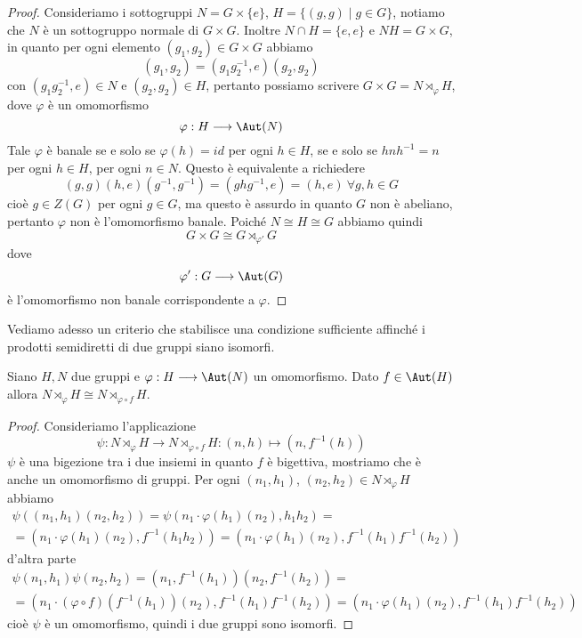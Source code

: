 \documentclass[11pt]{scrartcl}
\begin{document}
	\begin{proof}
		Consideriamo i sottogruppi $N = G\times\{e\}$, $H = \{(g, g) \mid g \in G\}$,
		notiamo che $N$ è un sottogruppo normale di $G\times G$. Inoltre 
		$N\cap H = \{e, e\}$ e $NH = G\times G$, in quanto per 
		ogni elemento $(g_1, g_2) \in G\times G$ abbiamo
		\[
		(g_1, g_2) = (g_1g_2^{-1}, e)(g_2, g_2)
		\]
		con $(g_1g_2^{-1}, e) \in N$ e $(g_2, g_2) \in H$, pertanto possiamo 
		scrivere $G \times G = N \rtimes_{\varphi} H$, dove $\varphi$ è un omomorfismo
		\[
		\varphi: H \longrightarrow \Aut(N)
		\]
		Tale $\varphi$ è banale se e solo se $\varphi(h) = id$ per ogni $h \in H$,
		se e solo se $hnh^{-1} = n$ per ogni $h \in H$, per ogni $n \in N$.
		Questo è equivalente a richiedere 
		\[
		(g, g)(h, e)(g^{-1}, g^{-1}) = (ghg^{-1}, e)= (h, e)~\forall g, h \in G
		\]
		cioè $g \in Z(G)$ per ogni $g \in G$,
		ma questo è assurdo in quanto $G$ non è abeliano, pertanto $\varphi$
		non è l'omomorfismo banale. Poiché $N \cong H \cong G$ abbiamo quindi
		\[
		G \times G \cong G\rtimes_{\varphi'}G
		\]
		dove
		\[
		\varphi':G \longrightarrow \Aut(G)
		\]
		è l'omomorfismo non banale corrispondente a $\varphi$.
	\end{proof}
	
	Vediamo adesso un criterio che stabilisce una condizione sufficiente affinché 
	i prodotti semidiretti di due gruppi siano isomorfi.
	
	\begin{proposition}
		\label{prop1.74}
		Siano $H, N$ due gruppi e $\varphi: H \longrightarrow \Aut(N)$ un omomorfismo.
		Dato $f \in \Aut(H)$ allora $N\rtimes_{\varphi} H \cong N\rtimes_{\varphi\circ f} H$.
	\end{proposition}
	
	\begin{proof}
		Consideriamo l'applicazione
		\[
		\psi: N\rtimes_{\varphi}H \longrightarrow N\rtimes_{\varphi\circ f}H:
		(n, h) \longmapsto (n, f^{-1}(h))
		\]
		$\psi$ è una bigezione tra i due insiemi in quanto $f$ è bigettiva,
		mostriamo che è anche un omomorfismo di gruppi. Per ogni $(n_1, h_1)$, $(n_2, h_2)
		\in N\rtimes_{\varphi}H$ abbiamo
		\begin{multline*}
			\psi((n_1, h_1)(n_2, h_2)) = \psi(n_1\cdot\varphi(h_1)(n_2), h_1h_2) = \\
			= (n_1\cdot\varphi(h_1)(n_2), f^{-1}(h_1h_2)) = (n_1\cdot\varphi(h_1)(n_2), f^{-1}(h_1)f^{-1}(h_2))
		\end{multline*}
		d'altra parte
		\begin{multline*}
			\psi(n_1, h_1)\psi(n_2, h_2) = (n_1, f^{-1}(h_1))(n_2, f^{-1}(h_2)) =\\
			= (n_1\cdot(\varphi\circ f)(f^{-1}(h_1))(n_2), f^{-1}(h_1)f^{-1}(h_2)) = 
			(n_1\cdot \varphi(h_1)(n_2), f^{-1}(h_1)f^{-1}(h_2))
		\end{multline*}
		cioè $\psi$ è un omomorfismo, quindi i due gruppi sono isomorfi.
	\end{proof}
	
\end{document}
